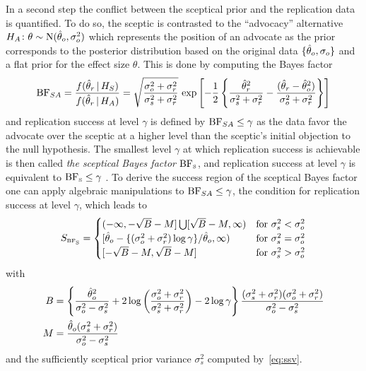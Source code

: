 \documentclass[a4paper, 11pt]{article}
\begin{document}
In a second step the conflict between the sceptical prior and the replication
data is quantified. To do so, the sceptic is contrasted to the ``advocacy''
alternative $H_{A} \colon \theta \sim \operatorname{N}(\hat{\theta}_{o}, \sigma^{2}_{o})$ which
represents the position of an advocate as the prior corresponds to the posterior
distribution based on the original data $\{\hat{\theta}_{o}, \sigma_{o}\}$ and a flat
prior for the effect size $\theta$. This is done by computing the Bayes factor
\begin{align*}
  \operatorname{BF}_{SA}
  = \frac{f(\hat{\theta}_{r} \,\vert\, H_{S})}{f(\hat{\theta}_{r} \,\vert\, H_{A})}
  = \sqrt{\frac{\sigma^{2}_{o} + \sigma^{2}_{r}}{\sigma^{2}_{s} + \sigma^{2}_{r}}}
  \, \exp\left[-\frac{1}{2}\left\{\frac{\hat{\theta}_{r}^{2}}{\sigma^{2}_{s} +
  \sigma^{2}_{r}} - \frac{(\hat{\theta}_{r} - \hat{\theta}_{o}^{2})}{\sigma^{2}_{o} +
  \sigma^{2}_{r}}\right\}\right]
\end{align*}
and replication success at level $\gamma$ is defined by $\operatorname{BF}_{SA} \leq \gamma$
as the data favor the advocate over the sceptic at a higher level than the
sceptic's initial objection to the null hypothesis. The smallest level $\gamma$
at which replication success is achievable is then called \emph{the sceptical
  Bayes factor} $\BFs$, and replication success at level $\gamma$ is equivalent
to $\text{BF}_{\scriptscriptstyle\text{S}} \leq \gamma$ \citep[see][for details on how to compute
$\BFs$]{Pawel2022b}. To derive the success region of the sceptical Bayes factor
one can apply algebraic manipulations to $\operatorname{BF}_{SA} \leq \gamma$, the condition
for replication success at level $\gamma$, which leads to
\begin{align}
  \label{eq:BFssuccess}
  S_{\scriptscriptstyle \BFs}
  = \begin{cases}
    (-\infty, -\sqrt{B} - M] \bigcup [\sqrt{B} - M, \infty) & \text{for} ~ \sigma^{2}_{s} < \sigma^{2}_{o} \\
    [\that_{o} -\{(\sigma^{2}_{o} + \sigma^{2}_{r})\log\gamma\}/\that_{o}, \infty)
    & \text{for} ~ \sigma^{2}_{s} = \sigma^{2}_{o}  \\
    [-\sqrt{B} - M, \sqrt{B} - M] & \text{for} ~ \sigma^{2}_{s} > \sigma^{2}_{o}
    \end{cases}
\end{align}
with
\begin{align*}
  B &= \left\{\frac{\hat{\theta}_{o}^{2}}{\sigma^{2}_{o} - \sigma^{2}_{s}} +
      2\log\left(\frac{\sigma^{2}_{o} + \sigma^{2}_{r}}{\sigma^{2}_{s} + \sigma^{2}_{r}}\right)
      - 2\log \gamma \right\}
      \frac{(\sigma^{2}_{s} + \sigma^{2}_{r})(\sigma^{2}_{o} + \sigma^{2}_{r})}{\sigma^{2}_{o}
       - \sigma^{2}_{s}} \\
  M &= \frac{\hat{\theta}_{o} (\sigma^{2}_{s} + \sigma^{2}_{r})}{\sigma^{2}_{o} - \sigma^{2}_{s}}
\end{align*}
and the sufficiently sceptical prior variance $\sigma^{2}_{s}$ computed
by~\eqref{eq:ssv}.
\end{document}
